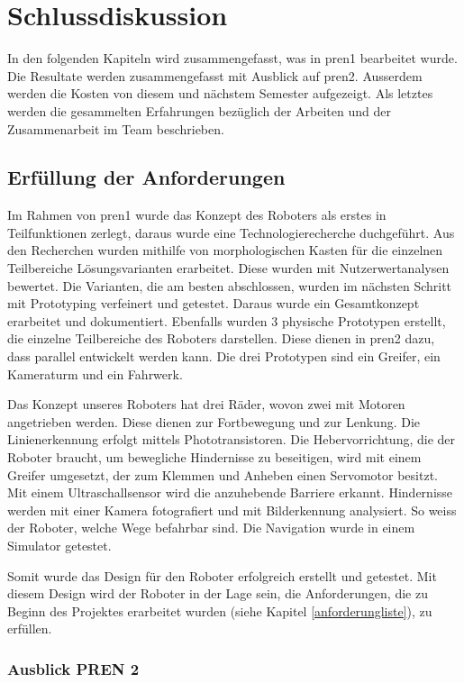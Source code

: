 \section{Schlussdiskussion}

In den folgenden Kapiteln wird zusammengefasst, was in \acrshort{pren1} bearbeitet wurde.
Die Resultate werden zusammengefasst mit Ausblick auf \acrshort{pren2}.
Ausserdem werden die Kosten von diesem und nächstem Semester aufgezeigt.
Als letztes werden die gesammelten Erfahrungen bezüglich der Arbeiten und der Zusammenarbeit im Team beschrieben.

\subsection{Erfüllung der Anforderungen}

Im Rahmen von \acrshort{pren1} wurde das Konzept des Roboters als erstes in Teilfunktionen zerlegt, daraus wurde eine Technologierecherche duchgeführt. Aus den Recherchen wurden mithilfe von morphologischen Kasten für die einzelnen Teilbereiche Lösungsvarianten erarbeitet. Diese wurden mit Nutzerwertanalysen bewertet. Die Varianten, die am besten abschlossen, wurden im nächsten Schritt mit Prototyping verfeinert und getestet. Daraus wurde ein Gesamtkonzept erarbeitet und dokumentiert. Ebenfalls wurden 3 physische Prototypen erstellt, die einzelne Teilbereiche des Roboters darstellen. Diese dienen in \acrshort{pren2} dazu, dass parallel entwickelt werden kann. Die drei Prototypen sind ein Greifer, ein Kameraturm und ein Fahrwerk.

Das Konzept unseres Roboters hat drei Räder, wovon zwei mit Motoren angetrieben werden. Diese dienen zur Fortbewegung und zur Lenkung. Die Linienerkennung erfolgt mittels Phototransistoren. Die Hebervorrichtung, die der Roboter braucht, um bewegliche Hindernisse zu beseitigen, wird mit einem Greifer umgesetzt, der zum Klemmen und Anheben einen Servomotor besitzt. Mit einem Ultraschallsensor wird die anzuhebende Barriere erkannt. 
Hindernisse werden mit einer Kamera fotografiert und mit Bilderkennung analysiert. So weiss der Roboter, welche Wege befahrbar sind. Die Navigation wurde in einem Simulator getestet.

Somit wurde das Design für den Roboter erfolgreich erstellt und getestet. Mit diesem Design wird der Roboter in der Lage sein, die Anforderungen, die zu Beginn des Projektes erarbeitet wurden (siehe Kapitel \ref{anforderungliste}), zu erfüllen.

\subsubsection{Ausblick PREN 2}

